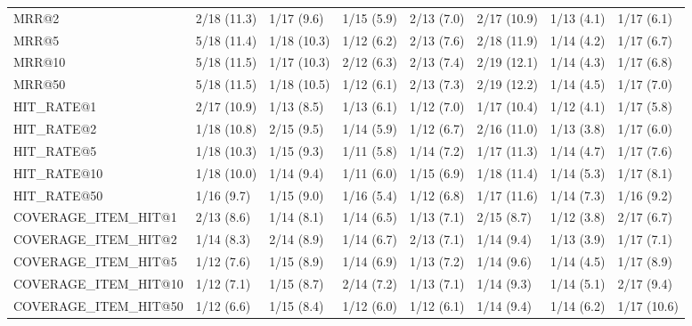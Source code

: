 \begin{tabular}{llllllll}
MRR@2                       &     2/18 (11.3) &       1/17 (9.6) &  1/15 (5.9) &  2/13 (7.0) &  2/17 (10.9) &     1/13 (4.1) &            1/17 (6.1) \\
MRR@5                       &     5/18 (11.4) &      1/18 (10.3) &  1/12 (6.2) &  2/13 (7.6) &  2/18 (11.9) &     1/14 (4.2) &            1/17 (6.7) \\
MRR@10                      &     5/18 (11.5) &      1/17 (10.3) &  2/12 (6.3) &  2/13 (7.4) &  2/19 (12.1) &     1/14 (4.3) &            1/17 (6.8) \\
MRR@50                      &     5/18 (11.5) &      1/18 (10.5) &  1/12 (6.1) &  2/13 (7.3) &  2/19 (12.2) &     1/14 (4.5) &            1/17 (7.0) \\
HIT_RATE@1                  &     2/17 (10.9) &       1/13 (8.5) &  1/13 (6.1) &  1/12 (7.0) &  1/17 (10.4) &     1/12 (4.1) &            1/17 (5.8) \\
HIT_RATE@2                  &     1/18 (10.8) &       2/15 (9.5) &  1/14 (5.9) &  1/12 (6.7) &  2/16 (11.0) &     1/13 (3.8) &            1/17 (6.0) \\
HIT_RATE@5                  &     1/18 (10.3) &       1/15 (9.3) &  1/11 (5.8) &  1/14 (7.2) &  1/17 (11.3) &     1/14 (4.7) &            1/17 (7.6) \\
HIT_RATE@10                 &     1/18 (10.0) &       1/14 (9.4) &  1/11 (6.0) &  1/15 (6.9) &  1/18 (11.4) &     1/14 (5.3) &            1/17 (8.1) \\
HIT_RATE@50                 &      1/16 (9.7) &       1/15 (9.0) &  1/16 (5.4) &  1/12 (6.8) &  1/17 (11.6) &     1/14 (7.3) &            1/16 (9.2) \\
COVERAGE_ITEM_HIT@1         &      2/13 (8.6) &       1/14 (8.1) &  1/14 (6.5) &  1/13 (7.1) &   2/15 (8.7) &     1/12 (3.8) &            2/17 (6.7) \\
COVERAGE_ITEM_HIT@2         &      1/14 (8.3) &       2/14 (8.9) &  1/14 (6.7) &  2/13 (7.1) &   1/14 (9.4) &     1/13 (3.9) &            1/17 (7.1) \\
COVERAGE_ITEM_HIT@5         &      1/12 (7.6) &       1/15 (8.9) &  1/14 (6.9) &  1/13 (7.2) &   1/14 (9.6) &     1/14 (4.5) &            1/17 (8.9) \\
COVERAGE_ITEM_HIT@10        &      1/12 (7.1) &       1/15 (8.7) &  2/14 (7.2) &  1/13 (7.1) &   1/14 (9.3) &     1/14 (5.1) &            2/17 (9.4) \\
COVERAGE_ITEM_HIT@50        &      1/12 (6.6) &       1/15 (8.4) &  1/12 (6.0) &  1/12 (6.1) &   1/14 (9.4) &     1/14 (6.2) &           1/17 (10.6) \\
\bottomrule
\end{tabular}
